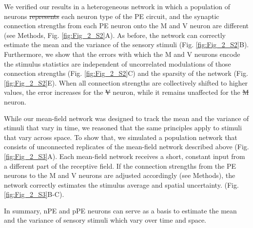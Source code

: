 \documentclass[10pt,a4paper]{article}
\providecommand{\DIFaddtex}[1]{{\protect\color{blue}\uwave{#1}}} %
\providecommand{\DIFdeltex}[1]{{\protect\color{red}\sout{#1}}}                      %
\providecommand{\DIFaddbegin}{} %
\providecommand{\DIFaddend}{} %
\providecommand{\DIFdelbegin}{} %
\providecommand{\DIFdelend}{} %
\providecommand{\DIFadd}[1]{\texorpdfstring{\DIFaddtex{#1}}{#1}} %
\providecommand{\DIFdel}[1]{\texorpdfstring{\DIFdeltex{#1}}{}} %
\newcommand{\DIFscaledelfig}{0.5}
\newlength{\DIFdelgraphicswidth} %
\newlength{\DIFdelgraphicsheight} %
\newcommand{\DIFaddincludegraphics}[2][]{{\color{blue}\fbox{\DIFOincludegraphics[#1]{#2}}}} %
\newcommand{\DIFdelincludegraphics}[2][]{%
\sbox{\DIFdelgraphicsbox}{\DIFOincludegraphics[#1]{#2}}%
\settoboxwidth{\DIFdelgraphicswidth}{\DIFdelgraphicsbox} %
\settoboxtotalheight{\DIFdelgraphicsheight}{\DIFdelgraphicsbox} %
\scalebox{\DIFscaledelfig}{%
\parbox[b]{\DIFdelgraphicswidth}{\usebox{\DIFdelgraphicsbox}\\[-\baselineskip] \rule{\DIFdelgraphicswidth}{0em}}\llap{\resizebox{\DIFdelgraphicswidth}{\DIFdelgraphicsheight}{%
\setlength{\unitlength}{\DIFdelgraphicswidth}%
\begin{picture}(1,1)%
\thicklines\linethickness{2pt} %
{\color[rgb]{1,0,0}\put(0,0){\framebox(1,1){}}}%
{\color[rgb]{1,0,0}\put(0,0){\line( 1,1){1}}}%
{\color[rgb]{1,0,0}\put(0,1){\line(1,-1){1}}}%
\end{picture}%
}\hspace*{3pt}}} %
} %
\DeclareRobustCommand{\DIFaddbegin}{\DIFOaddbegin \let\includegraphics\DIFaddincludegraphics} %
\DeclareRobustCommand{\DIFaddend}{\DIFOaddend \let\includegraphics\DIFOincludegraphics} %
\DeclareRobustCommand{\DIFdelbegin}{\DIFOdelbegin \let\includegraphics\DIFdelincludegraphics} %
\DeclareRobustCommand{\DIFdelend}{\DIFOaddend \let\includegraphics\DIFOincludegraphics} %
\begin{document}
We verified our results in a heterogeneous network in which a population of neurons \DIFdelbegin \DIFdel{represents }\DIFdelend \DIFaddbegin \DIFadd{belongs to }\DIFaddend each neuron type of the PE circuit, and the synaptic connection strengths from each PE neuron onto the M and V neuron are different (see Methods, Fig. \ref{fig:Fig_2_S2}A). As before, the network can correctly estimate the mean and the variance of the sensory stimuli (Fig. \ref{fig:Fig_2_S2}B). Furthermore, we show that the errors with which the M and V neurons encode the stimulus statistics are independent of uncorrelated modulations of those connection strengths (Fig. \ref{fig:Fig_2_S2}C) and the sparsity of the network (Fig. \ref{fig:Fig_2_S2}E). When all connection strengths are collectively shifted to higher values, the error increases for the \DIFdelbegin \DIFdel{V }\DIFdelend \DIFaddbegin \DIFadd{variance }\DIFaddend neuron, while it remains unaffected for the \DIFdelbegin \DIFdel{M }\DIFdelend \DIFaddbegin \DIFadd{memory }\DIFaddend neuron. 

While our mean-field network was designed to track the mean and the variance of stimuli that vary in time, we reasoned that the same principles apply to stimuli that vary across space. To show that, we simulated a population network that consists of unconnected replicates of the mean-field network described above (Fig. \ref{fig:Fig_2_S3}A). Each mean-field network receives a short, constant input from a different part of the receptive field. If the connection strengths from the PE neurons to the M and V neurons are adjusted accordingly (see Methods), the network correctly estimates the stimulus average and spatial uncertainty. (Fig. \ref{fig:Fig_2_S3}B-C).

In summary, nPE and pPE neurons can serve as a basis to estimate the mean and the variance of sensory stimuli which vary over time and space.
\end{document}
